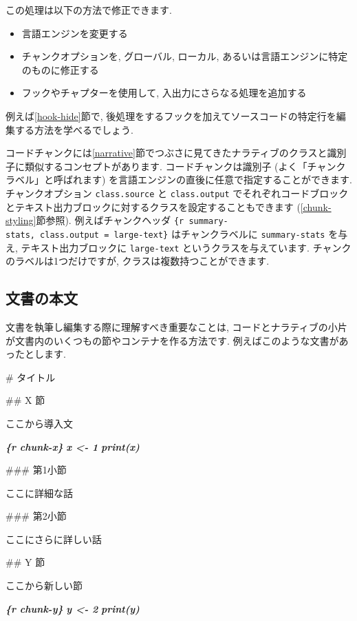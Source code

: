 \documentclass[
  11pt,
  lualatex,
  ja=standard]{bxjsreport}
\newenvironment{Shaded}{\begin{snugshade}}{\end{snugshade}}
\newcommand{\FunctionTok}[1]{\textcolor[rgb]{0.00,0.00,0.00}{#1}}
\newcommand{\InformationTok}[1]{\textcolor[rgb]{0.56,0.35,0.01}{\textbf{\textit{#1}}}}
\newcommand{\NormalTok}[1]{#1}
\begin{document}
この処理は以下の方法で修正できます.

\begin{itemize}
\item
  言語エンジンを変更する
\item
  チャンクオプションを, グローバル, ローカル, あるいは言語エンジンに特定のものに修正する
\item
  フックやチャプターを使用して, 入出力にさらなる処理を追加する
\end{itemize}

例えば\ref{hook-hide}節で, 後処理をするフックを加えてソースコードの特定行を編集する方法を学べるでしょう.

コードチャンクには\ref{narrative}節でつぶさに見てきたナラティブのクラスと識別子に類似するコンセプトがあります. コードチャンクは識別子 (よく「チャンクラベル」と呼ばれます) を言語エンジンの直後に任意で指定することができます. チャンクオプション \texttt{class.source} と \texttt{class.output} でそれぞれコードブロックとテキスト出力ブロックに対するクラスを設定することもできます (\ref{chunk-styling}節参照). 例えばチャンクヘッダ \texttt{\textasciigrave{}\textasciigrave{}\textasciigrave{}\{r\ summary-stats,\ class.output\ =\ \textquotesingle{}large-text\textquotesingle{}\}} はチャンクラベルに \texttt{summary-stats} を与え, テキスト出力ブロックに \texttt{large-text} というクラスを与えています. チャンクのラベルは1つだけですが, クラスは複数持つことができます.

\hypertarget{document-body}{%
\subsection{文書の本文}\label{document-body}}

文書を執筆し編集する際に理解すべき重要なことは, コードとナラティブの小片が文書内のいくつもの節やコンテナを作る方法です. 例えばこのような文書があったとします.

\begin{Shaded}
\begin{Highlighting}[]
\FunctionTok{\# タイトル}

\FunctionTok{\#\# X 節}

\NormalTok{ここから導入文}

\InformationTok{\textasciigrave{}\textasciigrave{}\textasciigrave{}\{r chunk{-}x\}}
\InformationTok{x \textless{}{-} 1}
\InformationTok{print(x)}
\InformationTok{\textasciigrave{}\textasciigrave{}\textasciigrave{}}

\FunctionTok{\#\#\# 第1小節}

\NormalTok{ここに詳細な話}

\FunctionTok{\#\#\# 第2小節}

\NormalTok{ここにさらに詳しい話}

\FunctionTok{\#\# Y 節}

\NormalTok{ここから新しい節}

\InformationTok{\textasciigrave{}\textasciigrave{}\textasciigrave{}\{r chunk{-}y\}}
\InformationTok{y \textless{}{-} 2}
\InformationTok{print(y)}
\InformationTok{\textasciigrave{}\textasciigrave{}\textasciigrave{}}
\end{Highlighting}
\end{Shaded}
\end{document}
